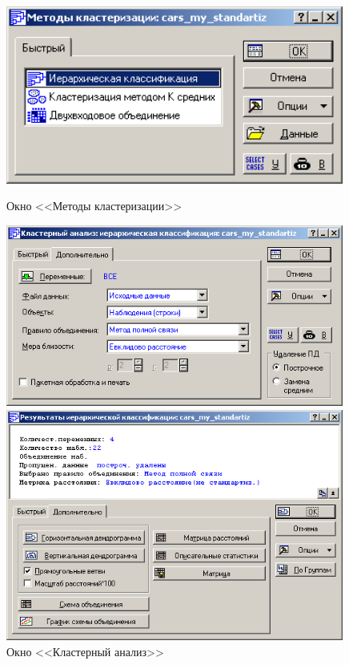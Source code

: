 \begin{figure}[!h]
  \centering
  \begin{minipage}{0.32\textwidth}
    \centering

    \includegraphics[width=0.99\textwidth]
    {inc/cars_my/1.4.PNG}

    \caption{Окно <<Методы кластеризации>>}
    \label{fig:1_4}
  \end{minipage}
  \begin{minipage}{0.32\textwidth}
    \centering

    \includegraphics[width=0.99\textwidth]
    {inc/cars_my/1.5.PNG}

    \caption{Окно <<Кластерный анализ>>}
    \label{fig:1_5}
  \end{minipage}
  \begin{minipage}{0.32\textwidth}
    \centering

    \includegraphics[width=0.99\textwidth]
    {inc/cars_my/1.6.PNG}


\end{minipage}
\end{figure}
